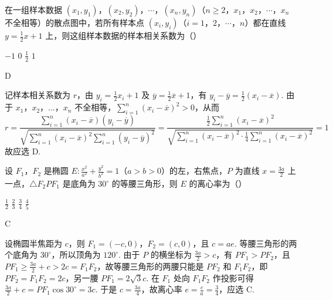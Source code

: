 \begin{problem}
在一组样本数据 \((x_{1}, y_{1})\)，\((x_{2}, y_{2})\)，\(\cdots\)，\((x_{n}, y_{n})\)（\(n \geqslant 2\)，\(x_{1}\)，\(x_{2}\)，\(\cdots\)，\(x_{n}\) 不全相等）的散点图中，若所有样本点 \((x_{i}, y_{i})\)（\(i = 1\)，\(2\)，\(\cdots\)，\(n\)）都在直线 \(y = \frac{1}{2}x + 1\) 上，则这组样本数据的样本相关系数为（\quad）

\choices
    {\(-1\)}
    {\(0\)}
    {\( \frac{1}{2} \)}
    {\(1\)}

\begin{answer}
D
\end{answer}

\begin{solution}
记样本相关系数为 \(r\)，由 \(y_i=\frac12x_i+1\) 及 \(\overline{y}=\frac12\overline{x}+1\)，有 \(y_i-\overline{y}=\frac12(x_i-\overline{x})\). 由于 \(x_1\)，\(x_2\)，\(\ldots\)，\(x_n\) 不全相等，\(\sum_{i=1}^n(x_i-\overline{x})^2>0\)，从而
\[
r=\frac{\sum_{i=1}^n(x_i-\overline{x})(y_i-\overline{y})}{\sqrt{\sum_{i=1}^n(x_i-\overline{x})^2\sum_{i=1}^n(y_i-\overline{y})^2}}=\frac{\frac12\sum_{i=1}^n(x_i-\overline{x})^2}{\sqrt{\sum_{i=1}^n(x_i-\overline{x})^2\cdot\frac14\sum_{i=1}^n(x_i-\overline{x})^2}}=1
\]
故应选 D.
\end{solution}
\end{problem}

\begin{problem}
设 \(F_{1}\)，\(F_{2}\) 是椭圆 \(E: \frac{x^{2}}{a^{2}} + \frac{y^{2}}{b^{2}} = 1\)（\(a > b > 0\)）的左，右焦点，\(P\) 为直线 \(x = \frac{3a}{2}\) 上一点，\(\triangle F_{2}PF_{1}\) 是底角为 \(30^{\circ}\) 的等腰三角形，则 \(E\) 的离心率为（\quad）

\choices
    {\( \frac{1}{2} \)}
    {\( \frac{2}{3} \)}
    {\( \frac{3}{4} \)}
    {\( \frac{4}{5} \)}

\begin{answer}
C
\end{answer}

\begin{solution}
设椭圆半焦距为 \(c\)，则 \(F_1=(-c,0)\)，\(F_2=(c,0)\)，且 \(c=ae\). 等腰三角形的两个底角为 \(30^{\circ}\)，所以顶角为 \(120^{\circ}\). 由于 \(P\) 的横坐标为 \(\frac{3a}{2}>c\)，有 \(PF_1>PF_2\)，且 \(PF_1\geqslant\frac{3a}{2}+c>2c=F_1F_2\)，故等腰三角形的两腰只能是 \(PF_2\) 和 \(F_1F_2\)，即 \(PF_2=F_1F_2=2c\)，另一腰 \(PF_1=2\sqrt{3}c\). 在 \(F_1\) 处向 \(F_1F_2\) 作投影可得
\(\frac{3a}{2}+c=PF_1\cos30^{\circ}=3c\). 于是 \(c=\frac{3a}{4}\)，故离心率 \(e=\frac{c}{a}=\frac34\)，应选 C.
\end{solution}
\end{problem}

